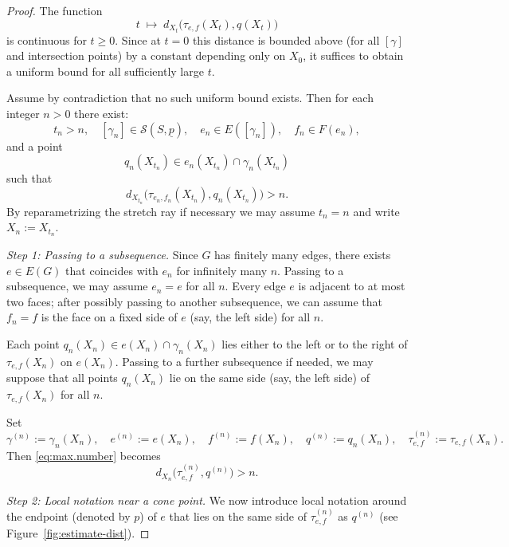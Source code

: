 \documentclass[11pt, letterpaper]{amsart}
\theoremstyle{definition}
\theoremstyle{remark}
\newcommand{\up}{\underline{p}}
\newcommand{\cS}{\mathcal{S}}
\numberwithin{equation}{section}
\begin{document}
\begin{proof}
The function
\[
  t \;\longmapsto\;
  d_{X_t}\!\bigl(\tau_{e,f}(X_t), q(X_t)\bigr)
\]
is continuous for \(t \ge 0\).
Since at \(t=0\) this distance is bounded above (for all \([\gamma]\) and intersection points) by a constant depending only on \(X_0\), it suffices to obtain a uniform bound for all sufficiently large \(t\).

Assume by contradiction that no such uniform bound exists.
Then for each integer \(n > 0\) there exist:
\[
  t_n > n,\quad
  [\gamma_n] \in \cS(S,\up),\quad
  e_n \in E([\gamma_n]),\quad
  f_n \in F(e_n),
\]
and a point
\[
  q_n(X_{t_n}) \in e_n(X_{t_n}) \cap \gamma_n(X_{t_n})
\]
such that
\begin{equation}
\label{eq:max.number}
  d_{X_{t_n}}\!\bigl(\tau_{e_n,f_n}(X_{t_n}), q_n(X_{t_n})\bigr) > n.
\end{equation}
By reparametrizing the stretch ray if necessary we may assume \(t_n = n\) and write \(X_n := X_{t_n}\).

\medskip\noindent
\emph{Step 1: Passing to a subsequence.}
Since \(G\) has finitely many edges, there exists \(e \in E(G)\) that coincides with \(e_n\) for infinitely many \(n\).
Passing to a subsequence, we may assume \(e_n = e\) for all \(n\).
Every edge \(e\) is adjacent to at most two faces; after possibly passing to another subsequence, we can assume that \(f_n = f\) is the face on a fixed side of \(e\) (say, the left side) for all \(n\).

Each point \(q_n(X_n) \in e(X_n)\cap\gamma_n(X_n)\) lies either to the left or to the right of \(\tau_{e,f}(X_n)\) on \(e(X_n)\).
Passing to a further subsequence if needed, we may suppose that all points \(q_n(X_n)\) lie on the same side (say, the left side) of \(\tau_{e,f}(X_n)\) for all \(n\).

Set
\[
  \gamma^{(n)} := \gamma_n(X_n),\quad
  e^{(n)} := e(X_n),\quad
  f^{(n)} := f(X_n),\quad
  q^{(n)} := q_n(X_n),\quad
  \tau_{e,f}^{(n)} := \tau_{e,f}(X_n).
\]
Then \eqref{eq:max.number} becomes
\begin{equation}
\label{eq:assump}
  d_{X_n}\!\bigl(\tau_{e,f}^{(n)}, q^{(n)}\bigr) > n.
\end{equation}

\medskip\noindent
\emph{Step 2: Local notation near a cone point.}
We now introduce local notation around the endpoint (denoted by $p$) of \(e\) that lies on the same side of \(\tau_{e,f}^{(n)}\) as \(q^{(n)}\) (see Figure~\ref{fig:estimate-dist}).


\end{proof}
\end{document}
